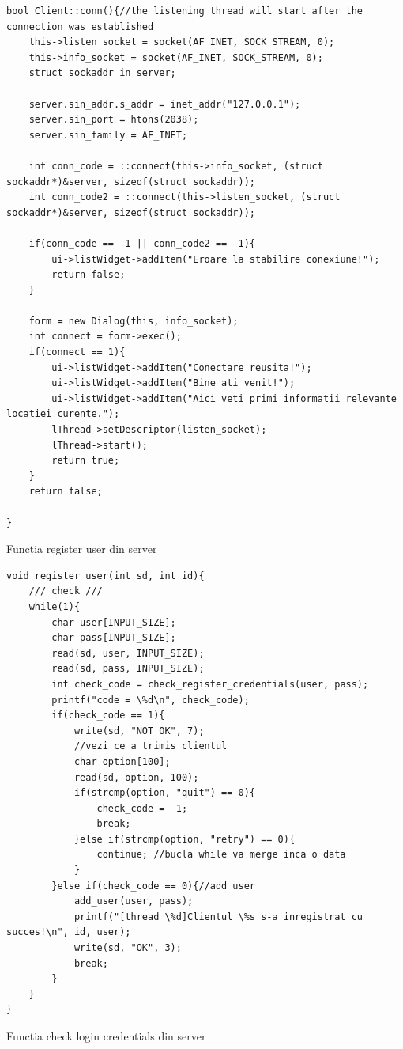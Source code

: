 \documentclass[runningheads]{llncs}
\begin{document}
\begin{lstlisting}
bool Client::conn(){//the listening thread will start after the connection was established
    this->listen_socket = socket(AF_INET, SOCK_STREAM, 0);
    this->info_socket = socket(AF_INET, SOCK_STREAM, 0);
    struct sockaddr_in server;

    server.sin_addr.s_addr = inet_addr("127.0.0.1");
    server.sin_port = htons(2038);
    server.sin_family = AF_INET;

    int conn_code = ::connect(this->info_socket, (struct sockaddr*)&server, sizeof(struct sockaddr));
    int conn_code2 = ::connect(this->listen_socket, (struct sockaddr*)&server, sizeof(struct sockaddr));

    if(conn_code == -1 || conn_code2 == -1){
        ui->listWidget->addItem("Eroare la stabilire conexiune!");
        return false;
    }

    form = new Dialog(this, info_socket);
    int connect = form->exec();
    if(connect == 1){
        ui->listWidget->addItem("Conectare reusita!");
        ui->listWidget->addItem("Bine ati venit!");
        ui->listWidget->addItem("Aici veti primi informatii relevante locatiei curente.");
        lThread->setDescriptor(listen_socket);
        lThread->start();
        return true;
    }
    return false;

}

\end{lstlisting}
Functia register user din server
\begin{lstlisting}
void register_user(int sd, int id){
    /// check ///
    while(1){
        char user[INPUT_SIZE]; 
        char pass[INPUT_SIZE]; 
        read(sd, user, INPUT_SIZE);
        read(sd, pass, INPUT_SIZE);
        int check_code = check_register_credentials(user, pass);
        printf("code = \%d\n", check_code);
        if(check_code == 1){
            write(sd, "NOT OK", 7);
            //vezi ce a trimis clientul
            char option[100];
            read(sd, option, 100);
            if(strcmp(option, "quit") == 0){
                check_code = -1;
                break;
            }else if(strcmp(option, "retry") == 0){
                continue; //bucla while va merge inca o data
            }
        }else if(check_code == 0){//add user
            add_user(user, pass);
            printf("[thread \%d]Clientul \%s s-a inregistrat cu succes!\n", id, user);
            write(sd, "OK", 3);
            break;             
        }
    }
}
\end{lstlisting}
Functia check login credentials din server
\end{document}

